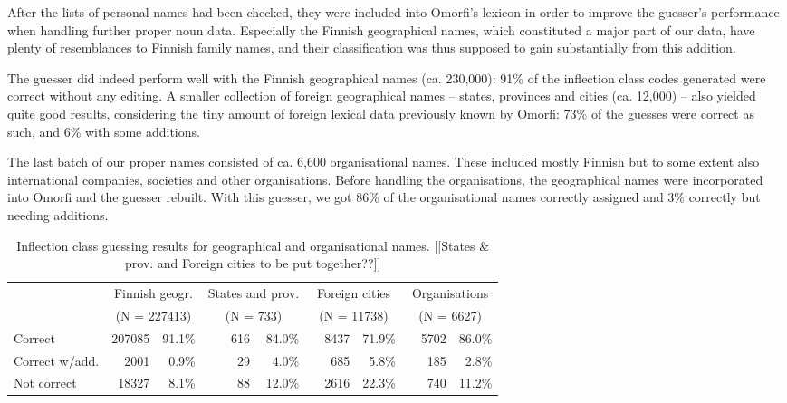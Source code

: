\documentclass{llncs}
\begin{document}
After the lists of personal names had been checked, they were included
into Omorfi's lexicon in order to improve the guesser's performance
when handling further proper noun data. Especially the Finnish
geographical names, which constituted a major part of our data, have
plenty of resemblances to Finnish family names, and their classification 
was thus supposed to gain substantially from this addition.

The guesser did indeed perform well with the Finnish geographical
names (ca. 230,000): 91\% of the inflection class codes generated were
correct without any editing. A smaller collection of foreign
geographical names -- states, provinces and cities (ca. 12,000) --
also yielded quite good results, considering the tiny amount of
foreign lexical data previously known by Omorfi: 73\% of the guesses
were correct as such, and 6\% with some additions.

The last batch of our proper names consisted of ca. 6,600
organisational names. These included mostly Finnish but to some extent
also international companies, societies and other
organisations. Before handling the organisations, the geographical
names were incorporated into Omorfi and the guesser rebuilt. With this
guesser, we got 86\% of the organisational names correctly assigned
and 3\% correctly but needing additions.

\begin{table}
\begin{center}
\begin{tabular}{l|rr|rr|rr|rr}
     & \multicolumn{2}{c|}{Finnish geogr.}  & \multicolumn{2}{c|}{States and prov.}  & \multicolumn{2}{c|}{Foreign cities}  & \multicolumn{2}{c}{Organisations}\\
     & \multicolumn{2}{c|}{(N = 227413)}  & \multicolumn{2}{c|}{(N = 733)}  & \multicolumn{2}{c|}{(N = 11738)}  & \multicolumn{2}{c}{(N = 6627)}\\
\hline
Correct        & 207085 & 91.1\%  & ~~~616  &  84.0\% & ~~8437 &   71.9\% & ~~5702 &   86.0\%\\
Correct w/add. & ~~2001 &  0.9\%  & ~~~~29  &   4.0\% & ~~~685 &    5.8\% & ~~~185 &    2.8\%\\
Not correct    & ~18327 &  8.1\%  & ~~~~88  &  12.0\% & ~~2616 &   22.3\% & ~~~740 &   11.2\%\\
\end{tabular}
\caption{Inflection class guessing results for geographical and organisational names.
[[States \& prov. and Foreign cities to be put together??]]
}\label{tab:lang-id-acc}
\end{center}
\end{table}
\end{document}
